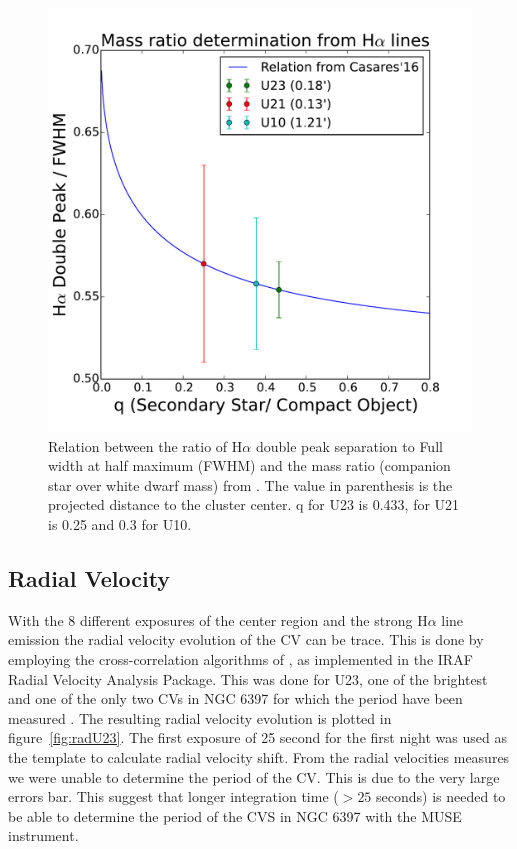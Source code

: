 \begin{figure}[h]
        \centering
        \includegraphics[scale=.5]{assets/images/mass.pdf}
\caption{Relation between the ratio of H$\alpha$ double peak separation to Full width at half maximum (FWHM) and the mass ratio (companion star over white dwarf mass) from \cite{casares_massration_20016}. The value in parenthesis is the projected distance to the cluster center. q for U23 is 0.433, for U21 is 0.25 and 0.3 for U10.}
\label{fig:mass}
\end{figure}

\subsection{Radial Velocity}

With the 8 different exposures of the center region and the strong H$\alpha$ line emission the radial velocity evolution of the CV can be trace. This is done by employing the cross-correlation algorithms of \cite{tonry_cross_1979}, as implemented in the IRAF Radial Velocity Analysis Package. This was done for U23, one of the brightest and one of the only two CVs in NGC 6397 for which the period have been measured \citep{kaluzny_time_2003}. The resulting radial velocity evolution is plotted in figure~\ref{fig:radU23}. The first exposure of 25 second for the first night was used as the template to calculate radial velocity shift. From the radial velocities measures we were unable to determine the period of the CV. This is due to the very large  errors bar. This suggest that longer integration time ($> 25$ seconds) is needed to be able to determine the period of the CVS in NGC 6397 with the MUSE instrument.   


